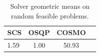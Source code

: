 \begin{table}
\centering
\caption{Solver geometric means on random feasible problems.}
\label{t-random feasible-geom_mean}
\begin{tabular}{lccc}
\toprule
 SCS &  OSQP &  COSMO \\
\midrule
1.59 &  1.00 &  50.93 \\
\bottomrule
\end{tabular}
\end{table}
